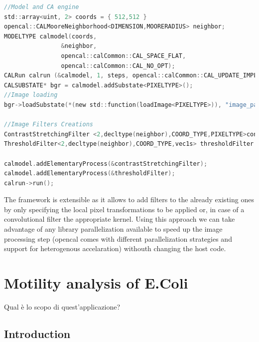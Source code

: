 \documentclass[conference]{IEEEtran}
\begin{document}
\begin{framed}
\begin{lstlisting}[language=C,caption=Example of usage of the Image processing XCA engine. A model and a CA runtime are created. The raw image is then read into the substate. Elementary processes corrensponding to the operations to be performed on the image are set and the runtime is launched. ,label=list:imgman]	
//Model and CA engine
std::array<uint, 2> coords = { 512,512 }
opencal::CALMooreNeighborhood<DIMENSION,MOORERADIUS> neighbor;
MODELTYPE calmodel(coords,
                &neighbor,
                opencal::calCommon::CAL_SPACE_FLAT,
                opencal::calCommon::CAL_NO_OPT);
CALRun calrun (&calmodel, 1, steps, opencal::calCommon::CAL_UPDATE_IMPLICIT); 
CALSUBSTATE* bgr = calmodel.addSubstate<PIXELTYPE>();
//Image loading
bgr->loadSubstate(*(new std::function(loadImage<PIXELTYPE>)), "image_path");

//Image Filters Creations
ContrastStretchingFilter <2,decltype(neighbor),COORD_TYPE,PIXELTYPE>contrastStretchingFilter(bgr, 1285, 1542, 0, 65535,1.0);
ThresholdFilter<2,decltype(neighbor),COORD_TYPE,vec1s> thresholdFilter (bgr,0,61680,0,65535);

calmodel.addElementaryProcess(&contrastStretchingFilter);
calmodel.addElementaryProcess(&thresholdFilter);
calrun->run();
\end{lstlisting}
\end{framed}
The framework is extensible as it allows to add filters to the already existing ones by only specifying the local pixel transformations to be applied or, in case of a convolutional filter the appropriate kernel.
Using this approach we can take advantage of any library parallelization available to speed up the image processing step (opencal comes with different parallelization strategies and support for heterogenous accelaration) withouth changing the host code.



\section{Motility analysis of E.Coli}
\label{sect:bacteriaanalysis}
Qual è lo scopo di quest'applicazione?
\subsection{Introduction}
\end{document}
